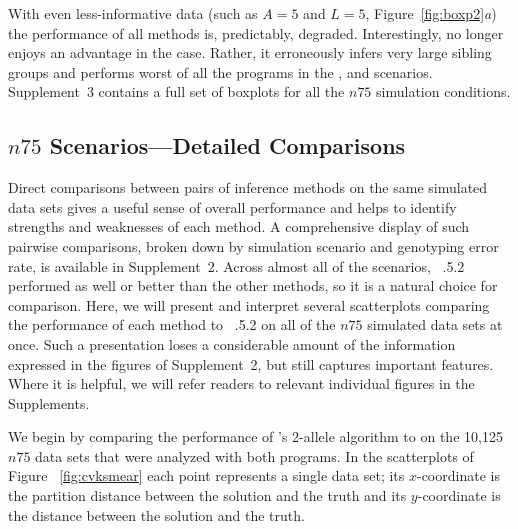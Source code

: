 With even less-informative data (such as $A=5$ and $L=5$, Figure~\ref{fig:boxp2}{\em a}) the performance of all methods is, predictably, 
degraded.  Interestingly, \prt{} no longer enjoys an advantage in the \nosibs{} case.  Rather, it erroneously infers very large sibling groups and performs worst of all the programs in the \nosibs{}, \allhalf{} and \allpathalf{} scenarios.  Supplement~3 contains a full set of boxplots for all the $n75$ simulation 
conditions.

\subsection*{$n75$ Scenarios---Detailed Comparisons}
Direct comparisons between pairs of inference methods on the same simulated data sets gives a useful 
sense of overall performance and helps to identify strengths and weaknesses of each method. A 
comprehensive display of such pairwise comparisons, broken down by simulation scenario and genotyping 
error rate, is available in Supplement~2. Across almost all of the scenarios, \colony~{.5.2} performed 
as well or better than the other methods, so it is a natural choice for comparison.
Here, we will present and interpret several scatterplots comparing the performance of each method to 
\colony~{.5.2} on all of the $n75$ simulated data sets at once.  Such a presentation loses a considerable 
amount of the information expressed in the figures of Supplement~2, but still captures important 
features.  Where it is helpful, we will refer readers to relevant individual figures in the 
Supplements.

We begin by comparing the performance of  \kinalyzer{}'s 2-allele algorithm to \colony{} on the 10,125 
$n75$ data sets that were analyzed with both programs.  In the scatterplots of Figure~
\ref{fig:cvksmear} each point represents a single data set; its $x$-coordinate is the partition 
distance between the \colony{} solution and the truth and its $y$-coordinate is the distance between 
the \kinalyzer{} solution and the truth.


